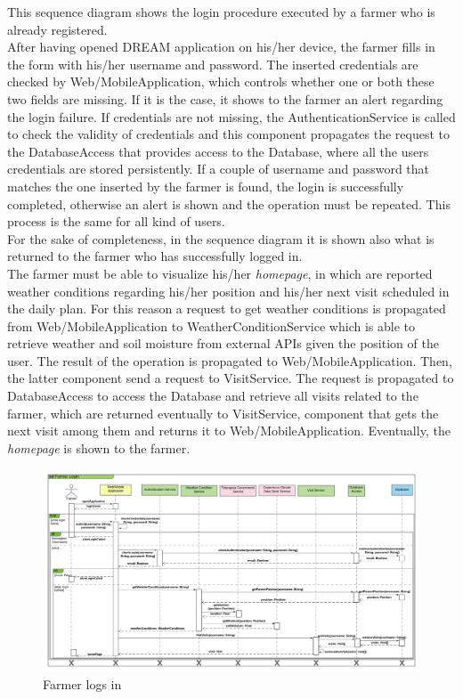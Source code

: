 This sequence diagram shows the login procedure executed by a farmer who is already registered.\\
After having opened DREAM application on his/her device, the farmer fills in the form with his/her username and password. The inserted credentials are checked by Web/MobileApplication, which controls whether one or both these two fields are missing. If it is the case, it shows to the farmer an alert regarding the login failure. If credentials are not missing, the AuthenticationService is called to check the validity of credentials and this component propagates the request to the DatabaseAccess that provides access to the Database, where all the users credentials are stored persistently. If a couple of username and password that matches the one inserted by the farmer is found, the login is successfully completed, otherwise an alert is shown and the operation must be repeated. This process is the same for all kind of users. \\
For the sake of completeness, in the sequence diagram it is shown also what is returned to the farmer who has successfully logged in. \\ 
The farmer must be able to visualize his/her \textit{homepage}, in which are reported weather conditions regarding his/her position and his/her next visit scheduled in the daily plan. For this reason a request to get weather conditions is propagated from Web/MobileApplication to WeatherConditionService which is able to retrieve weather and soil moisture from external APIs given the position of the user. The result of the operation is propagated to Web/MobileApplication. Then, the latter component send a request to VisitService. The request is propagated to DatabaseAccess to access the Database and retrieve all visits related to the farmer, which are returned eventually to VisitService, component that gets the next visit among them and returns it to Web/MobileApplication. Eventually, the \textit{homepage} is shown to the farmer. 

\newpage
\begin{landscape}
\begin{figure}[h]
\vspace*{-2cm}
\noindent
\centering
\centerline{\includegraphics[scale= 0.108]{./Images/Sequence diagram/Farmer Login Sequence Diagram.png}}
    \caption{Farmer logs in}
    \vspace*{-12cm}
\end{figure}
\fillandplacepagenumber
\end{landscape}

